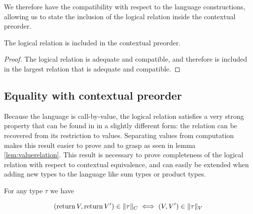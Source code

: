 We therefore have the compatibility with respect to the language constructions, 
allowing us to state the inclusion of the logical relation inside the contextual
preorder.

\begin{atheorem}
    \label{thm:inclusionpreorder}
    The logical relation is included in the contextual preorder.
\end{atheorem}

\begin{proof}
    The logical relation is adequate and compatible, and 
    therefore is included in the largest relation that 
    is adequate and compatible.
\end{proof}

\subsection{Equality with contextual preorder}

Because the language is call-by-value, the logical 
relation satisfies a very strong property that 
can be found in \cite{pitts1998existential} in a slightly different form:
the relation can be recovered from its restriction to values.
Separating values from computation makes this result easier to 
prove and to grasp as seen in lemma \ref{lem:valuerelation}.
This result is necessary to prove completeness of the logical 
relation with respect to contextual equivalence, and can easily 
be extended when adding new types to the language like sum types 
or product types.

\begin{alemma}
    \label{lem:valuerelation}
    For any type $\tau$ we have 

    \begin{equation*}
        (\operatorname{return} V, \operatorname{return} V') \in \| \tau \|_C
        \iff 
        (V,V') \in \| \tau \|_V
    \end{equation*}
\end{alemma}


